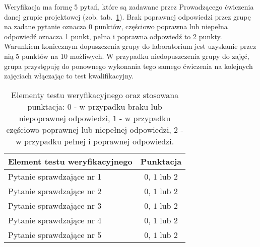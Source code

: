 \documentclass[11pt,onecolumn]{article}
\begin{document}
Weryfikacja ma formę 5 pytań, które są zadawane przez Prowadzącego ćwiczenia danej grupie projektowej (zob. tab.~\ref{tab:test_weryfikacyjny}). Brak poprawnej odpowiedzi przez grupę na zadane pytanie oznacza 0 punktów, częściowo poprawna lub niepełna odpowiedź oznacza 1 punkt, pełna i poprawna odpowiedź to 2 punkty. Warunkiem koniecznym dopuszczenia grupy do laboratorium jest uzyskanie przez nią 5 punktów na 10 możliwych. W przypadku niedopuszczenia grupy do zajęć, grupa przystępuję do ponownego wykonania tego samego ćwiczenia na kolejnych zajęciach włączając to test kwalifikacyjny.
%
\begin{table}[!ht]
\renewcommand{\arraystretch}{1.3}
\caption{Elementy testu weryfikacyjnego oraz stosowana punktacja: $0$ - w przypadku braku lub niepoprawnej odpowiedzi, $1$ - w przypadku częściowo poprawnej lub niepełnej odpowiedzi, $2$ - w przypadku pełnej i poprawnej odpowiedzi.}
\label{tab:test_weryfikacyjny}
\centering
\begin{tabular}{|l|c|}
\hline
\textbf{Element testu weryfikacyjnego} & \textbf{Punktacja} \\
\hline
\hline
Pytanie sprawdzające nr 1 & $0$, $1$ lub $2$ \\
\hline
Pytanie sprawdzające nr 2 & $0$, $1$ lub $2$ \\
\hline
Pytanie sprawdzające nr 3 & $0$, $1$ lub $2$ \\
\hline
Pytanie sprawdzające nr 4 & $0$, $1$ lub $2$ \\
\hline
Pytanie sprawdzające nr 5 & $0$, $1$ lub $2$ \\
\hline
\end{tabular}
\end{table}
%
\end{document}
